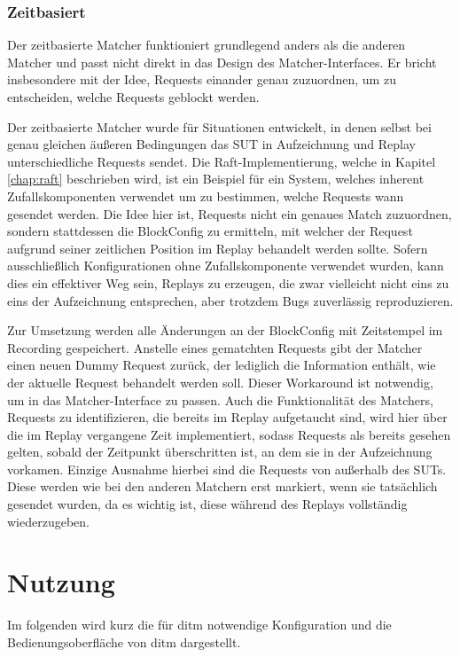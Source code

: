 \documentclass[12pt,a4paper]{report}
\begin{document}
\subsubsection{Zeitbasiert}
Der zeitbasierte Matcher funktioniert grundlegend anders als die anderen Matcher und passt nicht direkt in das Design des
Matcher-Interfaces. Er bricht insbesondere mit der Idee, Requests einander genau zuzuordnen, um zu entscheiden, welche Requests
geblockt werden.

Der zeitbasierte Matcher wurde für Situationen entwickelt, in denen selbst bei genau gleichen äußeren Bedingungen das SUT in
Aufzeichnung und Replay unterschiedliche Requests sendet. Die Raft-Implementierung, welche in Kapitel \ref{chap:raft} beschrieben
wird, ist ein Beispiel für ein System, welches inherent Zufallskomponenten verwendet um zu bestimmen, welche Requests wann
gesendet werden.  Die Idee hier ist, Requests nicht ein genaues Match zuzuordnen, sondern stattdessen die BlockConfig zu
ermitteln, mit welcher der Request aufgrund seiner zeitlichen Position im Replay behandelt werden sollte. Sofern ausschließlich
Konfigurationen ohne Zufallskomponente verwendet wurden, kann dies ein effektiver Weg sein, Replays zu erzeugen, die zwar
vielleicht nicht eins zu eins der Aufzeichnung entsprechen, aber trotzdem Bugs zuverlässig reproduzieren.

Zur Umsetzung werden alle Änderungen an der BlockConfig mit Zeitstempel im Recording gespeichert. Anstelle eines gematchten
Requests gibt der Matcher einen neuen Dummy Request zurück, der lediglich die Information enthält, wie der aktuelle Request
behandelt werden soll. Dieser Workaround ist notwendig, um in das Matcher-Interface zu passen. Auch die Funktionalität des
Matchers, Requests zu identifizieren, die bereits im Replay aufgetaucht sind, wird hier über die im Replay vergangene Zeit
implementiert, sodass Requests als bereits gesehen gelten, sobald der Zeitpunkt überschritten ist, an dem sie in der Aufzeichnung
vorkamen. Einzige Ausnahme hierbei sind die Requests von außerhalb des SUTs. Diese werden wie bei den anderen Matchern erst markiert,
wenn sie tatsächlich gesendet wurden, da es wichtig ist, diese während des Replays vollständig wiederzugeben.

\section{Nutzung}
Im folgenden wird kurz die für ditm notwendige Konfiguration und die Bedienungsoberfläche von ditm dargestellt.
\end{document}

